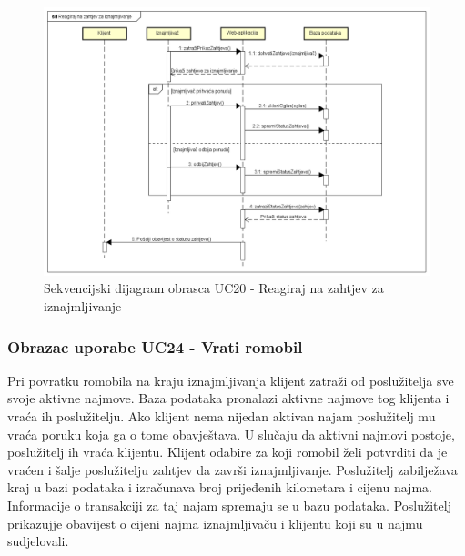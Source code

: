 				\begin{figure} [H]
					
					\includegraphics[width=1\linewidth]{dijagrami/UC20 - Reagiraj na zahtjev za iznajmljivanje.png}
					\centering
					\caption{Sekvencijski dijagram obrasca UC20 - Reagiraj na zahtjev za iznajmljivanje}
					\label{fig:Sekvencijski dijagram obrasca UC20 - Reagiraj na zahtjev za iznajmljivanje}
				\end{figure}
				
				\eject

				\subsubsection{Obrazac uporabe UC24 - Vrati romobil}
						Pri povratku romobila na kraju iznajmljivanja klijent zatraži od poslužitelja sve svoje aktivne najmove. Baza podataka pronalazi aktivne najmove tog klijenta i vraća ih poslužitelju. Ako klijent nema nijedan aktivan najam poslužitelj mu vraća poruku koja ga o tome obavještava. U slučaju da aktivni najmovi postoje, poslužitelj ih vraća klijentu. Klijent odabire za koji romobil želi potvrditi da je vraćen i šalje poslužitelju zahtjev da završi iznajmljivanje. Poslužitelj zabilježava kraj u bazi podataka i izračunava broj prijeđenih kilometara i cijenu najma. Informacije o transakciji za taj najam spremaju se u bazu podataka. Poslužitelj prikazujje obavijest o cijeni najma iznajmljivaču i klijentu koji su u najmu sudjelovali.
						
